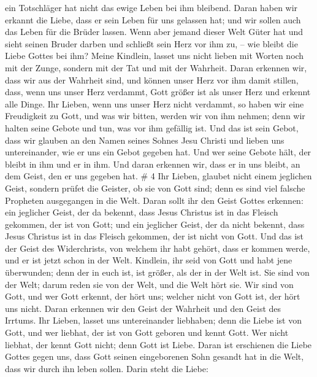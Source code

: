 ein Totschläger hat nicht das ewige Leben bei ihm bleibend.
 Daran haben wir erkannt die Liebe, dass er sein Leben für
uns gelassen hat; und wir sollen auch das Leben für die Brüder lassen.
 Wenn aber jemand dieser Welt Güter hat und sieht seinen
Bruder darben und schließt sein Herz vor ihm zu, -- wie bleibt die Liebe
Gottes bei ihm?  Meine Kindlein, lasset uns nicht lieben
mit Worten noch mit der Zunge, sondern mit der Tat und mit der Wahrheit.
 Daran erkennen wir, dass wir aus der Wahrheit sind, und
können unser Herz vor ihm damit stillen,  dass, wenn uns
unser Herz verdammt, Gott größer ist als unser Herz und erkennt alle
Dinge.  Ihr Lieben, wenn uns unser Herz nicht verdammt, so
haben wir eine Freudigkeit zu Gott,  und was wir bitten,
werden wir von ihm nehmen; denn wir halten seine Gebote und tun, was vor
ihm gefällig ist.  Und das ist sein Gebot, dass wir glauben
an den Namen seines Sohnes Jesu Christi und lieben uns untereinander,
wie er uns ein Gebot gegeben hat.  Und wer seine Gebote
hält, der bleibt in ihm und er in ihm. Und daran erkennen wir, dass er
in uns bleibt, an dem Geist, den er uns gegeben hat. \# 4 
Ihr Lieben, glaubet nicht einem jeglichen Geist, sondern prüfet die
Geister, ob sie von Gott sind; denn es sind viel falsche Propheten
ausgegangen in die Welt.  Daran sollt ihr den Geist Gottes
erkennen: ein jeglicher Geist, der da bekennt, dass Jesus Christus ist
in das Fleisch gekommen, der ist von Gott;  und ein
jeglicher Geist, der da nicht bekennt, dass Jesus Christus ist in das
Fleisch gekommen, der ist nicht von Gott. Und das ist der Geist des
Widerchrists, von welchem ihr habt gehört, dass er kommen werde, und er
ist jetzt schon in der Welt.  Kindlein, ihr seid von Gott
und habt jene überwunden; denn der in euch ist, ist größer, als der in
der Welt ist.  Sie sind von der Welt; darum reden sie von
der Welt, und die Welt hört sie.  Wir sind von Gott, und wer
Gott erkennt, der hört uns; welcher nicht von Gott ist, der hört uns
nicht. Daran erkennen wir den Geist der Wahrheit und den Geist des
Irrtums.  Ihr Lieben, lasset uns untereinander liebhaben;
denn die Liebe ist von Gott, und wer liebhat, der ist von Gott geboren
und kennt Gott.  Wer nicht liebhat, der kennt Gott nicht;
denn Gott ist Liebe.  Daran ist erschienen die Liebe Gottes
gegen uns, dass Gott seinen eingeborenen Sohn gesandt hat in die Welt,
dass wir durch ihn leben sollen.  Darin steht die Liebe:
